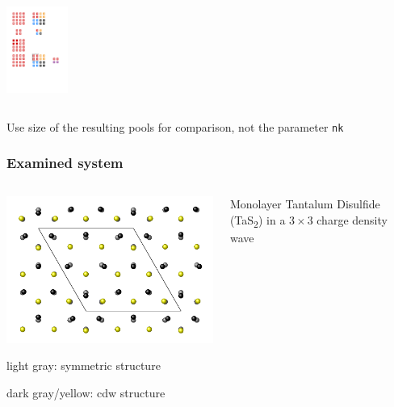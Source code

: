 \documentclass[aspectratio=169]{beamer}
\newcommand{\TaS}{TaS\textsubscript{2}\xspace}
\begin{document}
\begin{frame}
\begin{columns}
\begin{column}{0.5\textwidth}
			\centering
			\includegraphics[width=0.15\textwidth]{figs/np4_nk_4.pdf}			
		\end{column}
	\end{columns}
	
	\vspace{8pt}

	Use size of the resulting pools for comparison, not the parameter \texttt{nk}

\end{frame}


\begin{frame}
	\frametitle{Examined system}

	\begin{columns}
		\begin{column}{0.5\textwidth}
			\includegraphics[width=\textwidth]{figs/symmetric.pdf}

			\centering
			light gray: symmetric structure

			dark gray/yellow: cdw structure
		\end{column}

		\begin{column}{0.5\textwidth}
			Monolayer Tantalum Disulfide (\TaS) in a \(3\times 3\) charge density wave
		\end{column}
	\end{columns}	

\end{frame}
\end{document}
